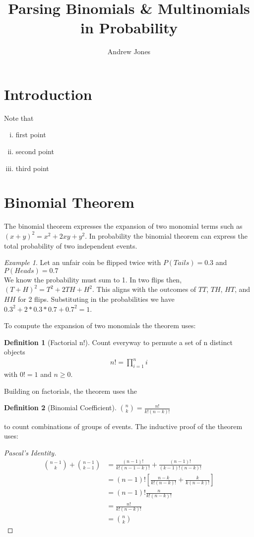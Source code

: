 \documentclass{article}
\title{Parsing Binomials \& Multinomials in Probability}
\author{Andrew Jones}\date{}
\theoremstyle{plain}
\theoremstyle{definition}
\newtheorem{definition}{Definition}
\theoremstyle{remark}
\newtheorem{example}{Example}
\begin{document}
\maketitle



\section*{Introduction}

Note that
\begin{enumerate}[i.,noitemsep]
	\item first point
	\item second point
	\item third point
\end{enumerate}




\section{Binomial Theorem}
The binomial theorem expresses the expansion of two monomial terms such as $(x + y)^2 = x^2 + 2xy + y^2$. In probability the binomial theorem can express the total probability of two independent events.
\begin{example}
  Let an unfair coin be flipped twice with $P(Tails) = 0.3$ and $P(Heads) = 0.7$ \\
  We know the probability must sum to 1. In two flips then, $(T + H)^2 = T^2 + 2TH + H^2$. This aligns with the outcomes of $TT$, $TH$, $HT$, and $HH$ for 2 flips. Substituting in the probabilities we have $0.3^2 + 2*0.3*0.7 + 0.7^2 = 1$.
\end{example}
 To compute the expansion of two monomials the theorem uses:
\begin{definition}[Factorial n!]
  Count everyway to permute a set of n distinct objects
  \begin{align*}
    n! = {\displaystyle\prod_{i=1}^{n}i}
  \end{align*}
  with $0! = 1$ and $n \geq 0$.
\end{definition}
Building on factorials, the theorem uses the
\begin{definition}[Binomial Coefficient]
	$\binom{n}{k} = \frac{n!}{k!(n-k)!}$
\end{definition}
to count combinations of groups of events.
The inductive proof of the theorem uses:
\begin{proof}[Pascal's Identity]
  \begin{align*}
    \binom{n - 1}{k} + \binom{n - 1}{k - 1} &= \frac{(n-1)!}{k!(n - 1 - k)!} + \frac{(n - 1)!}{(k-1)!(n-k)!} \\
    &= (n - 1)![\frac{n-k}{k!(n-k)!} + \frac{k}{k(n-k)!}] \\
    &= (n - 1)!\frac{n}{k!(n-k)!} \\
    &= \frac{n!}{k!(n - k)!} \\
    &= \binom{n}{k}
  \end{align*}
\end{proof}
\end{document}
